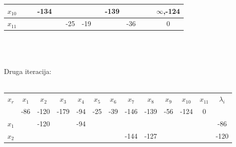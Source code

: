 \documentclass[12pt]{article}
\begin{document}
\begin{enumerate}
\begin{tabular}{|c|c|c|c|c|c|c|c|c|c|c|c|c|}
$x_{10}$ & {\color[HTML]{000000} }         & {\color[HTML]{000000} }         & {\color[HTML]{000000} -134}     & {\color[HTML]{000000} }         & {\color[HTML]{FE0000} }         & {\color[HTML]{000000} }         & {\color[HTML]{000000} }         & {\color[HTML]{FE0000} -139}     & {\color[HTML]{000000} }         & {\color[HTML]{000000} }         &          & {\color[HTML]{000000} $\infty$,-124}      \\ \hline
$x_{11}$ &                                 &                                 &                                 &                                 & {\color[HTML]{FE0000} -25}      & {\color[HTML]{000000} -19}      & {\color[HTML]{FE0000} }         & {\color[HTML]{FE0000} }         & {\color[HTML]{000000} -36}      &                                 &          & 0                                         \\ \hline
\end{tabular}
\\
\\
\\
Druga iteracija:
\\
\\
\begin{tabular}{|c|c|c|c|c|c|c|c|c|c|c|c|c|}
\hline
$x_r$    & $x_{1}$                    & $x_{2}$                     & $x_{3}$                     & $x_{4}$                    & $x_{5}$                    & $x_{6}$                    & $x_{7}$                     & $x_{8}$                     & $x_{9}$                    & $x_{10}$                    & $x_{11}$                 & $\lambda_i$                      \\ \cline{2-12}
         & {\color[HTML]{3166FF} -86} & {\color[HTML]{3166FF} -120} & {\color[HTML]{000000} -179} & {\color[HTML]{3166FF} -94} & {\color[HTML]{3166FF} -25} & {\color[HTML]{3166FF} -39} & {\color[HTML]{3166FF} -146} & {\color[HTML]{3166FF} -139} & {\color[HTML]{3166FF} -56} & {\color[HTML]{3166FF} -124} & {\color[HTML]{3166FF} 0} & {\color[HTML]{000000} }          \\ \hline
$x_{1}$  & {\color[HTML]{000000} }    & {\color[HTML]{000000} -120} & {\color[HTML]{000000} }     & {\color[HTML]{000000} -94} & {\color[HTML]{000000} }    & {\color[HTML]{000000} }    & {\color[HTML]{000000} }     & {\color[HTML]{000000} }     & {\color[HTML]{000000} }    & {\color[HTML]{000000} }     & {\color[HTML]{000000} }  & {\color[HTML]{000000} -86}       \\ \hline
$x_{2}$  & {\color[HTML]{000000} }    & {\color[HTML]{000000} }     & {\color[HTML]{000000} }     & {\color[HTML]{000000} }    & {\color[HTML]{000000} }    & {\color[HTML]{000000} }    & {\color[HTML]{000000} -144} & {\color[HTML]{000000} -127} & {\color[HTML]{000000} }    & {\color[HTML]{000000} }     & {\color[HTML]{000000} }  & {\color[HTML]{000000} -120}      \\ \hline

\end{tabular}
\end{enumerate}
\end{document}
